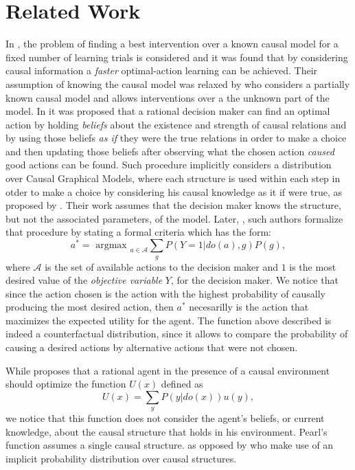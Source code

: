\documentclass[letterpaper]{article}
\begin{document}
\section{Related Work}
In \cite{lattimoreNIPS2016}, the problem of finding a best intervention over a known causal model for a fixed number of learning trials is considered and it was found that by considering causal information a \textit{faster} optimal-action learning can be achieved. Their assumption of knowing the causal model was relaxed by \cite{sen2017identifying} who considers a partially known causal model and allows interventions over a the unknown part of the model. In \cite{gonzalez2018playing} it was proposed that a rational decision maker can find an optimal action by holding \textit{beliefs} about the existence and strength of causal relations and by using those beliefs \textit{as if} they were the true relations in order to make a choice and then updating those beliefs after observing what the chosen action \textit{caused} good actions can be found. Such procedure implicitly considers a distribution over Causal Graphical Models, where each structure is used within each step in otder to make a choice by considering his causal knowledge as it if were true, as proposed by \cite{joyce1999foundations}. Their work assumes that the decision maker knows the structure, but not the associated parameters, of the model. Later, \cite{2019arXiv190202279G}, such authors formalize that procedure by stating a formal criteria which has the form:
\[  a^\ast = \textrm{ argmax }_{a \in \mathcal{A}}\sum_g P(Y=1 | do(a), g)P(g), \]
where $\mathcal{A}$ is the set of available actions to the decision maker and $1$ is the most desired value of the \textit{objective variable} $Y$, for the decision maker. We notice that since the action chosen is the action with the highest probability of causally producing the most desired action, then $a^\ast$ necesarilly is the action that maximizes the expected utility for the agent. The function above described is indeed a counterfactual distribution, since it allows to compare the probability of causing a desired actions by alternative actions that were not chosen.

While \cite{pearl2009causality} proposes that a rational agent in the presence of a causal environment should optimize the function $U(x)$ defined as 
\[ U(x)=\sum_y P(y | do(x)) u(y), \]
we notice that this function does not consider the agent's beliefs, or current knowledge, about the causal structure that holds in his environment. Pearl's function assumes a single causal structure. as opposed by \cite{2019arXiv190202279G} who make use of an implicit probability distribution over causal structures.
\end{document}
